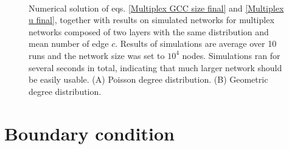\documentclass[
11pt, %
english, %
singlespacing, %
liststotoc, %
headsepline, %
]{MastersDoctoralThesis} %
\begin{document}
{
\begin{figure}
	\\
	\caption{Numerical solution of eqs. \eqref{Multiplex GCC size final} and \eqref{Multiplex u final}, together with results on simulated networks for multiplex networks composed of two layers with the same distribution and mean number of edge $c$. Results of simulations are average over 10 runs and the network size was set to $10^4$ nodes. Simulations ran for several seconds in total, indicating that much larger network should be easily usable. (A) Poisson degree distribution. (B) Geometric degree distribution.}
\end{figure}
}

\newpage

\section{Boundary condition}
\end{document}
